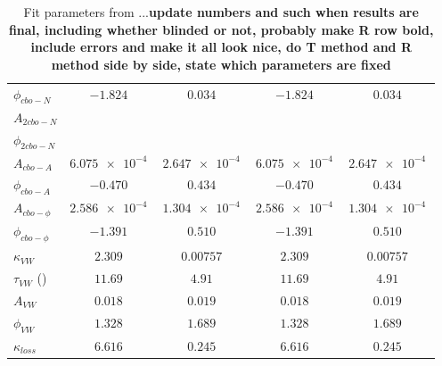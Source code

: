\begin{table}[]
\begin{tabular*}{.85\linewidth}{@{\extracolsep{\fill}}lcccc}
		$\phi_{cbo-N}$   	  		&  $\SI{-1.824}{}$ & $\SI{0.034}{}$ & $\SI{-1.824}{}$ & $\SI{0.034}{}$ \\
		$A_{2cbo-N}$   	 	  		&  $\SI{}{}$ & $\SI{}{}$ & $\SI{}{}$ & $\SI{}{}$ \\
		$\phi_{2cbo-N}$   	  		&  $\SI{}{}$ & $\SI{}{}$ & $\SI{}{}$ & $\SI{}{}$ \\
		$A_{cbo-A}$   	 	  		&  $\SI{6.075e-4}{}$ & $\SI{2.647e-4}{}$ & $\SI{6.075e-4}{}$ & $\SI{2.647e-4}{}$ \\
		$\phi_{cbo-A}$   	  		&  $\SI{-0.470}{}$ & $\SI{0.434}{}$ & $\SI{-0.470}{}$ & $\SI{0.434}{}$ \\
		$A_{cbo-\phi}$   	  		&  $\SI{2.586e-4}{}$ & $\SI{1.304e-4}{}$ & $\SI{2.586e-4}{}$ & $\SI{1.304e-4}{}$ \\
		$\phi_{cbo-\phi}$     		&  $\SI{-1.391}{}$ & $\SI{0.510}{}$ & $\SI{-1.391}{}$ & $\SI{0.510}{}$ \\
		$\kappa_{VW}$   	    	&  $\SI{2.309}{}$ & $\SI{0.00757}{}$ & $\SI{2.309}{}$ & $\SI{0.00757}{}$ \\
		$\tau_{VW}$ (\mus{})        &  $\SI{11.69}{}$ & $\SI{4.91}{}$ & $\SI{11.69}{}$ & $\SI{4.91}{}$ \\
		$A_{VW}$   	 		  		&  $\SI{0.018}{}$ & $\SI{0.019}{}$ & $\SI{0.018}{}$ & $\SI{0.019}{}$ \\
		$\phi_{VW}$   	  	  		&  $\SI{1.328}{}$ & $\SI{1.689}{}$ & $\SI{1.328}{}$ & $\SI{1.689}{}$ \\
		$\kappa_{loss}$   	    	&  $\SI{6.616}{}$ & $\SI{0.245}{}$ & $\SI{6.616}{}$ & $\SI{0.245}{}$ \\
	  \hline
	\end{tabular*}
	\caption[Fit parameter values versus dataset]{Fit parameters from ...\textbf{update numbers and such when results are final, including whether blinded or not, probably make R row bold, include errors and make it all look nice, do T method and R method side by side, state which parameters are fixed}}
	\label{tab:DatasetFitParametersValue}
	\end{table}




